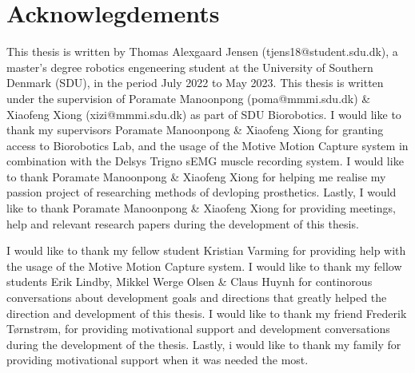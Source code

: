\documentclass[../main.tex]{subfiles}
\begin{document}
\section*{Acknowlegdements}

This thesis is written by Thomas Alexgaard Jensen (tjens18@student.sdu.dk), a master's degree robotics engeneering student at the University of Southern Denmark (SDU), in the period July 2022 to May 2023.
This thesis is written under the supervision of Poramate Manoonpong (poma@mmmi.sdu.dk) \& Xiaofeng Xiong (xizi@mmmi.sdu.dk) as part of SDU Biorobotics.
I would like to thank my supervisors Poramate Manoonpong \& Xiaofeng Xiong for granting access to Biorobotics Lab, and the usage of the Motive Motion Capture system in combination with the Delsys Trigno sEMG muscle recording system.
I would like to thank Poramate Manoonpong \& Xiaofeng Xiong for helping me realise my passion project of researching methods of devloping prosthetics.
Lastly, I would like to thank Poramate Manoonpong \& Xiaofeng Xiong for providing meetings, help and relevant research papers during the development of this thesis.

I would like to thank my fellow student Kristian Varming for providing help with the usage of the Motive Motion Capture system.
I would like to thank my fellow students Erik Lindby, Mikkel Werge Olsen \& Claus Huynh for continorous conversations about development goals and directions that greatly helped the direction and development of this thesis.
I would like to thank my friend Frederik Tørnstrøm, for providing motivational support and development conversations during the development of the thesis.
Lastly, i would like to thank my family for providing motivational support when it was needed the most.
\end{document}
